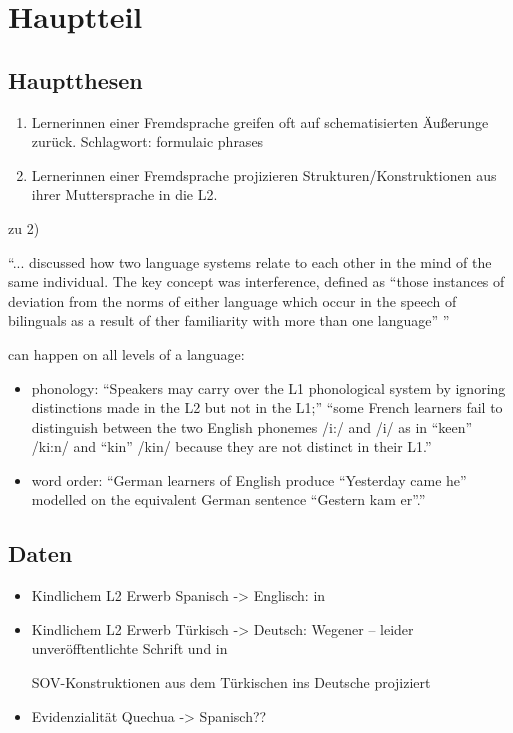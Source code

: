\section{Hauptteil}

\subsection{Hauptthesen}
\begin{enumerate}
    \item Lernerinnen einer Fremdsprache greifen oft auf schematisierten Äußerunge zurück.
Schlagwort: formulaic phrases
    \item Lernerinnen einer Fremdsprache projizieren Strukturen/Konstruktionen aus ihrer Muttersprache in die L2.
\end{enumerate}


zu 2)

\cite{Weinreich79} ``... discussed how two language systems relate to each other in the mind of the same individual.
The key concept was interference, defined as ``those instances of deviation from the norms of either language which occur in the speech of bilinguals as a result of ther familiarity with more than one language'' \cite{Weinreich79} '' \cite{Cook93}

can happen on all levels of a language:
\begin{itemize}
    \item phonology: ``Speakers may carry over the L1 phonological system by ignoring distinctions made in the L2 but not in the L1;'' \cite{Cook93}
        ``some French learners fail to distinguish between the two English phonemes /i:/ and /i/ as in ``keen'' /ki:n/ and ``kin'' /kin/ because they are not distinct in their L1.''
    \item word order: ``German learners of English produce ``Yesterday came he'' modelled on the equivalent German sentence ``Gestern kam er''.''
\end{itemize}

\subsection{Daten}
\begin{itemize}
    \item Kindlichem L2 Erwerb Spanisch -> Englisch: \cite{Wong-Fillmore76} in \cite{Haberzettl06}
    \item Kindlichem L2 Erwerb Türkisch -> Deutsch: Wegener\cite{} -- leider unveröfftentlichte Schrift
und \cite{Haberzettl05} in \cite{Haberzettl06}

SOV-Konstruktionen aus dem Türkischen ins Deutsche projiziert

    \item Evidenzialität Quechua -> Spanisch??
\end{itemize}
